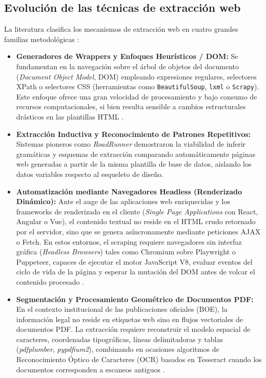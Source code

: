 \subsection{Evolución de las técnicas de extracción web}
La literatura clasifica los mecanismos de extracción web en cuatro grandes familias metodológicas \cite{ferrara2014web, crescenzi2001roadrunner}:
\begin{itemize}
    \item \textbf{Generadores de Wrappers y Enfoques Heurísticos / DOM:} Se fundamentan en la navegación sobre el árbol de objetos del documento (\textit{Document Object Model}, DOM) empleando expresiones regulares, selectores XPath o selectores CSS (herramientas como \texttt{BeautifulSoup}, \texttt{lxml} o \texttt{Scrapy}). Este enfoque ofrece una gran velocidad de procesamiento y bajo consumo de recursos computacionales, si bien resulta sensible a cambios estructurales drásticos en las plantillas HTML \cite{glez2014web}.
    \item \textbf{Extracción Inductiva y Reconocimiento de Patrones Repetitivos:} Sistemas pioneros como \textit{RoadRunner} \cite{crescenzi2001roadrunner} demostraron la viabilidad de inferir gramáticas y esquemas de extracción comparando automáticamente páginas web generadas a partir de la misma plantilla de base de datos, aislando los datos variables respecto al esqueleto de diseño.
    \item \textbf{Automatización mediante Navegadores Headless (Renderizado Dinámico):} Ante el auge de las aplicaciones web enriquecidas y los frameworks de renderizado en el cliente (\textit{Single Page Applications} con React, Angular o Vue), el contenido textual no reside en el HTML crudo retornado por el servidor, sino que se genera asíncronamente mediante peticiones AJAX o Fetch. En estos entornos, el scraping requiere navegadores sin interfaz gráfica (\textit{Headless Browsers}) tales como Chromium sobre Playwright o Puppeteer, capaces de ejecutar el motor JavaScript V8, evaluar eventos del ciclo de vida de la página y esperar la mutación del DOM antes de volcar el contenido procesado \cite{singrodia2019review}.
    \item \textbf{Segmentación y Procesamiento Geométrico de Documentos PDF:} En el contexto institucional de las publicaciones oficiales (BOE), la información legal no reside en etiquetas web sino en flujos vectoriales de documentos PDF. La extracción requiere reconstruir el modelo espacial de caracteres, coordenadas tipográficas, líneas delimitadoras y tablas (\textit{pdfplumber}, \textit{pypdfium2}), combinando en ocasiones algoritmos de Reconocimiento Óptico de Caracteres (OCR) basados en Tesseract cuando los documentos corresponden a escaneos antiguos \cite{ferrara2014web}.
\end{itemize}


